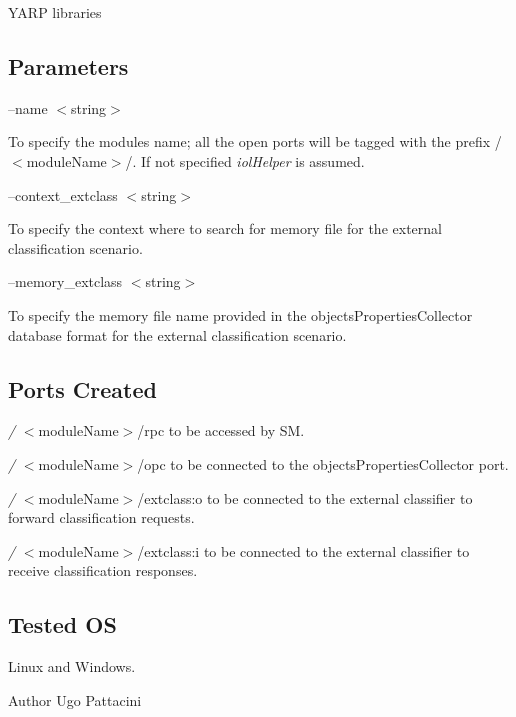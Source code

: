 \begin{DoxyItemize}
\item Y\+A\+RP libraries
\end{DoxyItemize}\hypertarget{group__iolReachingCalibration_parameters_sec}{}\subsection{Parameters}\label{group__iolReachingCalibration_parameters_sec}
--name $<$string$>$
\begin{DoxyItemize}
\item To specify the module\textquotesingle{}s name; all the open ports will be tagged with the prefix /$<$module\+Name$>$/. If not specified {\itshape iol\+Helper} is assumed.
\end{DoxyItemize}

--context\+\_\+extclass $<$string$>$
\begin{DoxyItemize}
\item To specify the context where to search for memory file for the external classification scenario.
\end{DoxyItemize}

--memory\+\_\+extclass $<$string$>$
\begin{DoxyItemize}
\item To specify the memory file name provided in the objects\+Properties\+Collector database format for the external classification scenario.
\end{DoxyItemize}\hypertarget{group__icub__iolStateMachineHandler_portsc_sec}{}\subsection{Ports Created}\label{group__icub__iolStateMachineHandler_portsc_sec}

\begin{DoxyItemize}
\item {\itshape /} $<$module\+Name$>$/rpc to be accessed by SM.
\item {\itshape /} $<$module\+Name$>$/opc to be connected to the objects\+Properties\+Collector port.
\item {\itshape /} $<$module\+Name$>$/extclass\+:o to be connected to the external classifier to forward classification requests.
\item {\itshape /} $<$module\+Name$>$/extclass\+:i to be connected to the external classifier to receive classification responses.
\end{DoxyItemize}\hypertarget{group__icub__iolStateMachineHandler_tested_os_sec}{}\subsection{Tested OS}\label{group__icub__iolStateMachineHandler_tested_os_sec}
Linux and Windows.

\begin{DoxyAuthor}{Author}
Ugo Pattacini 
\end{DoxyAuthor}
